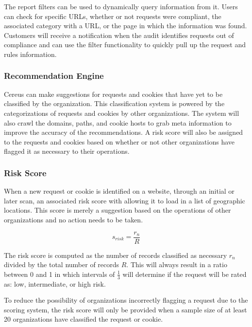 
The report filters can be used to dynamically query information from it. Users can check for specific URLs, whether or not requests were compliant, the associated category with a URL, or the page in which the information was found. Customers will receive a notification when the audit identifies requests out of compliance and can use the filter functionality to quickly pull up the request and rules information. 

\subsubsection{Recommendation Engine}

Cereus can make suggestions for requests and cookies that have yet to be classified by the organization. This classification system is powered by the categorizations of requests and cookies by other organizations. The system will also crawl the domains, paths, and cookie hosts to grab meta information to improve the accuracy of the recommendations. A risk score will also be assigned to the requests and cookies based on whether or not other organizations have flagged it as necessary to their operations.

\subsubsection*{Risk Score}

When a new request or cookie is identified on a website, through an initial or later scan, an associated risk score with allowing it to load in a list of geographic locations. This score is merely a suggestion based on the operations of other organizations and no action needs to be taken.

\[ s_{risk} = \frac{r_n}{R} \]

The risk score is computed as the number of records classified as necessary \( r_n \) divided by the total number of records \( R \). This will always result in a ratio between 0 and 1 in which intervals of \(\frac{1}{3}\) will determine if the request will be rated as: low, intermediate, or high risk.

To reduce the possibility of organizations incorrectly flagging a request due to the scoring system, the risk score will only be provided when a sample size of at least 20 organizations have classified the request or cookie.

